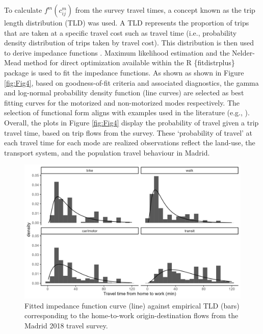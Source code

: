 \documentclass[]{trbunofficial}
\begin{document}
To calculate \(f^m(c_{ij}^m)\) from the survey travel times, a concept
known as the trip length distribution (TLD) was used. A TLD represents
the proportion of trips that are taken at a specific travel cost such as
travel time (i.e., probability density distribution of trips taken by
travel cost). This distribution is then used to derive impedance
functions \citep[e.g., done in the accessibility works
of][\citet{horbachov_theoretical_2018}, and
\citet{batista_estimation_2019} for example]{lopez_2017_spatial}.
Maximum likelihood estimation and the Nelder-Mead method for direct
optimization available within the R \{fitdistrplus\} package
\citep{fitdistrplus_2015} is used to fit the impedance functions. As
shown as shown in Figure \ref{fig:Fig4}, based on goodness-of-fit
criteria and associated diagnostics, the gamma and log-normal
probability density function (line curves) are selected as best fitting
curves for the motorized and non-motorized modes respectively. The
selection of functional form aligns with examples used in the literature
(e.g., \citet{reggianiAccessibilityImpedanceForms2011}). Overall, the
plots in Figure \ref{fig:Fig4} display the probability of travel given a
trip travel time, based on trip flows from the survey. These
`probability of travel' at each travel time for each mode are realized
observations reflect the land-use, the transport system, and the
population travel behaviour in Madrid.

\begin{figure}

{\centering \includegraphics[width=1\linewidth]{images/tlds_curves_m_plot} 

}

\caption{\label{fig:Fig4} Fitted impedance function curve (line) against empirical TLD (bars) corresponding to the home-to-work origin-destination flows from the Madrid 2018 travel survey.}\label{fig:tlds-curves-m-plot}
\end{figure}
\end{document}
